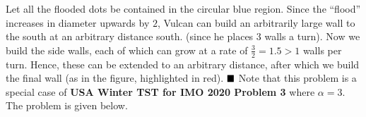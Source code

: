 \documentclass[fontsize=9pt]{scrartcl}
\begin{document}
	\begin{center}
	\end{center}
	Let all the flooded dots be contained in the circular blue region. Since the ``flood''
	increases in diameter upwards by $2$, Vulcan can build an arbitrarily large wall
	to the south at an arbitrary distance south. (since he places $3$ walls a turn).
	Now we build the side walls, each of which can grow at a rate of
	$\frac{3}{2} = 1.5 > 1$ walls per turn. Hence, these can be extended to an
	arbitrary distance, after which we build the final wall (as in the figure, highlighted
	in red). $\hfill \blacksquare$
	\newline
	\newline
	Note that this problem is a special case of \textbf{\textsf{USA Winter TST for
	IMO 2020 Problem 3}} where $\alpha = 3$. The problem is given below.
	\newline
\end{document}

